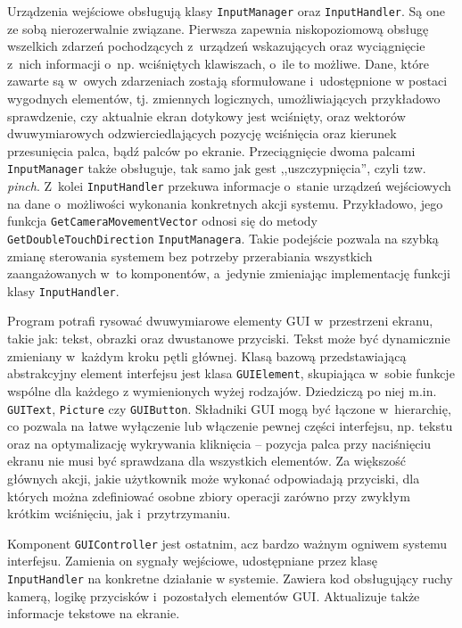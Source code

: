 		Urządzenia wejściowe obsługują klasy \texttt{InputManager} oraz \texttt{InputHandler}. Są one ze sobą nierozerwalnie związane. Pierwsza zapewnia niskopoziomową obsługę wszelkich zdarzeń pochodzących z~urządzeń wskazujących oraz wyciągnięcie z~nich informacji o~np. wciśniętych klawiszach, o~ile to możliwe. Dane, które zawarte są w~owych zdarzeniach zostają sformułowane i~udostępnione w postaci wygodnych elementów, tj. zmiennych logicznych, umożliwiających przykładowo sprawdzenie, czy aktualnie ekran dotykowy jest wciśnięty, oraz wektorów dwuwymiarowych odzwierciedlających pozycję wciśnięcia oraz kierunek przesunięcia palca, bądź palców po ekranie. Przeciągnięcie dwoma palcami \texttt{InputManager} także obsługuje, tak samo jak gest ,,uszczypnięcia'', czyli tzw. \emph{pinch}. Z~kolei \texttt{InputHandler} przekuwa informacje o~stanie urządzeń wejściowych na dane o~możliwości wykonania konkretnych akcji systemu. Przykładowo, jego funkcja \texttt{GetCameraMovementVector} odnosi się do metody \texttt{GetDoubleTouchDirection} \texttt{InputManagera}. Takie podejście pozwala na szybką zmianę sterowania systemem bez potrzeby przerabiania wszystkich zaangażowanych w~to komponentów, a~jedynie zmieniając implementację funkcji klasy \texttt{InputHandler}. 
		
		Program potrafi rysować dwuwymiarowe elementy GUI w~przestrzeni ekranu, takie jak: tekst, obrazki oraz dwustanowe przyciski.
		Tekst może być dynamicznie zmieniany w~każdym kroku pętli głównej. Klasą bazową przedstawiającą abstrakcyjny element interfejsu jest klasa \texttt{GUIElement}, skupiająca w~sobie funkcje wspólne dla każdego z wymienionych wyżej rodzajów. Dziedziczą po niej m.in. \texttt{GUIText}, \texttt{Picture} czy \texttt{GUIButton}. Składniki GUI mogą być łączone w~hierarchię, co pozwala na łatwe wyłączenie lub włączenie pewnej części interfejsu, np. tekstu oraz na optymalizację wykrywania kliknięcia -- pozycja palca przy naciśnięciu ekranu nie musi być sprawdzana dla wszystkich elementów. Za większość głównych akcji, jakie użytkownik może wykonać odpowiadają przyciski, dla których można zdefiniować osobne zbiory operacji zarówno przy zwykłym krótkim wciśnięciu, jak i~przytrzymaniu.
		
		Komponent \texttt{GUIController} jest ostatnim, acz bardzo ważnym ogniwem systemu interfejsu. Zamienia on sygnały wejściowe, udostępniane przez klasę \texttt{InputHandler} na konkretne działanie w systemie. Zawiera kod obsługujący ruchy kamerą, logikę przycisków i~pozostałych elementów GUI. Aktualizuje także informacje tekstowe na ekranie. 
		
